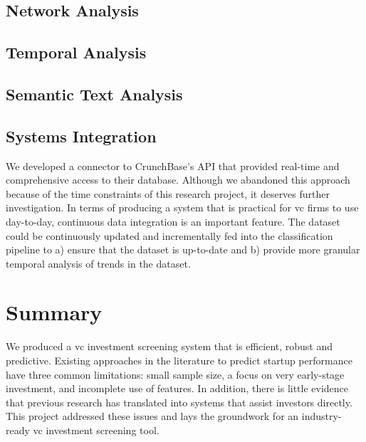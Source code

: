 \documentclass[../thesis/thesis.tex]{subfiles}
\begin{document}
\subsection{Network Analysis}


\subsection{Temporal Analysis}


\subsection{Semantic Text Analysis}


\subsection{Systems Integration}

We developed a connector to CrunchBase’s API that provided real-time and comprehensive access to their database. Although we abandoned this approach because of the time constraints of this research project, it deserves further investigation. In terms of producing a system that is practical for \gls{vc} firms to use day-to-day, continuous data integration is an important feature. The dataset could be continuously updated and incrementally fed into the classification pipeline to a) ensure that the dataset is up-to-date and b) provide more granular temporal analysis of trends in the dataset.

\section{Summary}

We produced a \gls{vc} investment screening system that is efficient, robust and predictive. Existing approaches in the literature to predict startup performance have three common limitations: small sample size, a focus on very early-stage investment, and incomplete use of features. In addition, there is little evidence that previous research has translated into systems that assist investors directly. This project addressed these issues and lays the groundwork for an industry-ready \gls{vc} investment screening tool.

\end{document}
